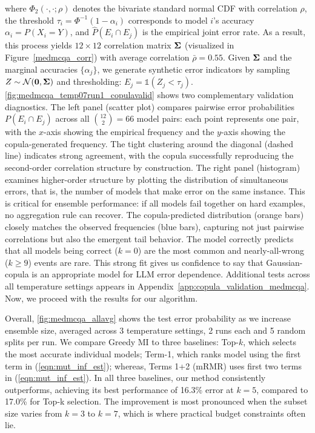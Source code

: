 \documentclass{article}
\theoremstyle{plain}
\theoremstyle{definition}
\theoremstyle{remark}
\begin{document}
where $\Phi_2(\cdot, \cdot; \rho)$ denotes the bivariate standard normal CDF with correlation $\rho$, the threshold $\tau_i = \Phi^{-1}(1 - \alpha_i)$ corresponds to model $i$'s accuracy $\alpha_i = P(X_i = Y)$, and $\hat{P}(E_i \cap E_j)$ is the empirical joint error rate. As a result, this process yields $12 \times 12$ correlation matrix $\bf\Sigma$ (visualized in Figure~\ref{medmcqa_corr}) with average correlation $\bar{\rho} = 0.55$. Given $\bf\Sigma$ and the marginal accuracies $\{\alpha_j\}$, we generate synthetic error indicators by sampling $Z \sim \mathcal{N}({\bf0}, {\bf\Sigma})$ and thresholding: $E_j = \mathds{1}(Z_j < \tau_j)$. \cref{fig:medmcqa_temp07run1_copulavalid} shows two complementary validation diagnostics. The left panel (scatter plot) compares pairwise error probabilities $P(E_i \cap E_j)$ across all ${12 \choose 2} = 66$ model pairs: each point represents one pair, with the $x$-axis showing the empirical frequency and the $y$-axis showing the copula-generated frequency. The tight clustering around the diagonal (dashed line) indicates strong agreement, with the copula successfully reproducing the second-order correlation structure by construction. The right panel (histogram) examines higher-order structure by plotting the distribution of simultaneous errors, that is, the number of models that make error on the same instance. This is critical for ensemble performance: if all models fail together on hard examples, no aggregation rule can recover. The copula-predicted distribution (orange bars) closely matches the observed frequencies (blue bars), capturing not just pairwise correlations but also the emergent tail behavior. The model correctly predicts that all models being correct ($k=0$) are the most common   and nearly-all-wrong ($k \geq 9$) events are rare. This strong fit gives us confidence to say that Gaussian-copula is an appropriate model for LLM error dependence. Additional tests across all temperature settings appears in Appendix~\ref{app:copula_validation_medmcqa}. Now, we proceed with the results for our algorithm.

Overall, \cref{fig:medmcqa_allavg} shows the test error probability as we increase ensemble size, averaged across 3 temperature settings, 2 runs each and 5 random splits per run. We compare Greedy MI to three baselines: Top-$k$, which selects the most accurate individual models; Term-1, which ranks model using the first term in (\ref{eqn:mut_inf_est}); whereas, Terms 1+2 (mRMR) uses first two terms in (\ref{eqn:mut_inf_est}). In all three baselines, our method consistently outperforms, achieving its best performance of 16.3\% error at $k=5$, compared to 17.0\% for Top-k selection. The improvement is most pronounced when the subset size varies from $k=3$ to $k=7$, which is where practical budget constraints often lie.
\end{document}
